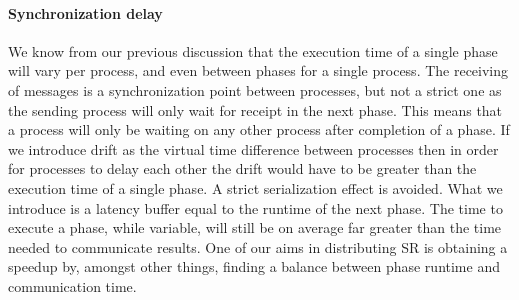 \paragraph{Synchronization delay}
We know from our previous discussion that the execution time of a single phase will vary per process, and even between phases for a single process. The receiving of messages is a synchronization point between processes, but not a strict one as the sending process will only wait for receipt in the next phase. This means that a process will only be waiting on any other process after completion of a phase. If we introduce drift as the virtual time difference between processes then in order for processes to delay each other the drift would have to be greater than the execution time of a single phase. A strict serialization effect is avoided. What we introduce is a latency buffer equal to the runtime of the next phase. The time to execute a phase, while variable, will still be on average far greater than the time needed to communicate results. One of our aims in distributing SR is obtaining a speedup by, amongst other things, finding a balance between phase runtime and communication time.

